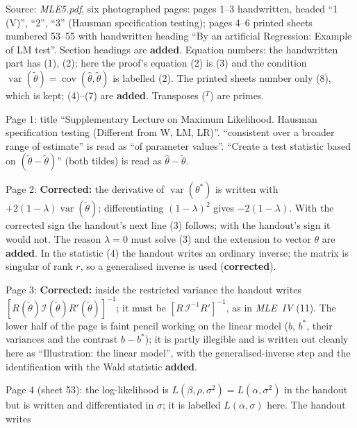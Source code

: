 \documentclass[11pt]{article}
\begin{document}
\clearpage
\begin{transcriptnotes}
 \item Source: \emph{MLE5.pdf}, six photographed pages: pages 1--3 handwritten, headed ``1\,(V)'', ``2'', ``3''
       (Hausman specification testing); pages 4--6 printed sheets numbered 53--55 with handwritten heading
       ``By an artificial Regression: Example of LM test''. Section headings are \textbf{added}. Equation
       numbers: the handwritten part has (1), (2); here the proof's equation (2) is (3) and the condition
       $\operatorname{var}(\tilde\theta)=\operatorname{cov}(\hat\theta,\tilde\theta)$ is labelled (2). The printed sheets number only (8),
       which is kept; (4)--(7) are \textbf{added}. Transposes ($^{T}$) are primes.
 \item Page 1: title ``Supplementary Lecture on Maximum Likelihood. Hausman specification testing (Different
       from W, LM, LR)''. ``consistent over a broader range of estimate'' is read as ``of parameter values''.
       ``Create a test statistic based on $(\tilde\theta-\tilde\theta)$'' (both tildes) is read as $\hat\theta-\tilde\theta$.
 \item Page 2: \textbf{Corrected:} the derivative of $\operatorname{var}(\theta^{*})$ is written with $+2(1-\lambda)\operatorname{var}(\tilde\theta)$;
       differentiating $(1-\lambda)^{2}$ gives $-2(1-\lambda)$. With the corrected sign the handout's next line
       (3) follows; with the handout's sign it would not. The reason $\lambda=0$ must solve (3) and the
       extension to vector $\theta$ are \textbf{added}. In the statistic (4) the handout writes an ordinary inverse;
       the matrix is singular of rank $r$, so a generalised inverse is used (\textbf{corrected}).
 \item Page 3: \textbf{Corrected:} inside the restricted variance the handout writes
       $[R(\tilde\theta)\mathcal I(\tilde\theta)R'(\tilde\theta)]^{-1}$; it must be $[R\,\mathcal I^{-1}R']^{-1}$, as in \emph{MLE~IV}
       (11). The lower half of the page is faint pencil working on the linear model ($b$, $b^{*}$, their
       variances and the contrast $b-b^{*}$); it is partly illegible and is written out cleanly here as
       ``Illustration: the linear model'', with the generalised-inverse step and the identification with the
       Wald statistic \textbf{added}.
 \item Page 4 (sheet 53): the log-likelihood is $L(\beta,\rho,\sigma^{2})=L(\alpha,\sigma^{2})$ in the handout but is written
       and differentiated in $\sigma$; it is labelled $L(\alpha,\sigma)$ here. The handout writes

\end{transcriptnotes}
\end{document}
